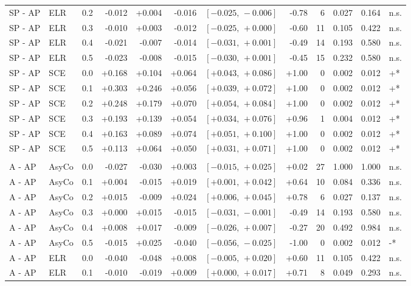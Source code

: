 \begin{landscape}
\begin{scriptsize}
\begin{longtable}{lllrrrrrrrrl}
SP - AP & ELR & 0.2 & -0.012 & +0.004 & -0.016 & $[-0.025,\,-0.006]$ & -0.78 & 6 & 0.027 & 0.164 & n.s. \\
SP - AP & ELR & 0.3 & -0.010 & +0.003 & -0.012 & $[-0.025,\,+0.000]$ & -0.60 & 11 & 0.105 & 0.422 & n.s. \\
SP - AP & ELR & 0.4 & -0.021 & -0.007 & -0.014 & $[-0.031,\,+0.001]$ & -0.49 & 14 & 0.193 & 0.580 & n.s. \\
SP - AP & ELR & 0.5 & -0.023 & -0.008 & -0.015 & $[-0.030,\,+0.001]$ & -0.45 & 15 & 0.232 & 0.580 & n.s. \\
SP - AP & SCE & 0.0 & +0.168 & +0.104 & +0.064 & $[+0.043,\,+0.086]$ & +1.00 & 0 & 0.002 & 0.012 & +* \\
SP - AP & SCE & 0.1 & +0.303 & +0.246 & +0.056 & $[+0.039,\,+0.072]$ & +1.00 & 0 & 0.002 & 0.012 & +* \\
SP - AP & SCE & 0.2 & +0.248 & +0.179 & +0.070 & $[+0.054,\,+0.084]$ & +1.00 & 0 & 0.002 & 0.012 & +* \\
SP - AP & SCE & 0.3 & +0.193 & +0.139 & +0.054 & $[+0.034,\,+0.076]$ & +0.96 & 1 & 0.004 & 0.012 & +* \\
SP - AP & SCE & 0.4 & +0.163 & +0.089 & +0.074 & $[+0.051,\,+0.100]$ & +1.00 & 0 & 0.002 & 0.012 & +* \\
SP - AP & SCE & 0.5 & +0.113 & +0.064 & +0.050 & $[+0.031,\,+0.071]$ & +1.00 & 0 & 0.002 & 0.012 & +* \\
\addlinespace
\multicolumn{12}{l}{\textit{Macro AUC}} \\
A - AP & AsyCo & 0.0 & -0.027 & -0.030 & +0.003 & $[-0.015,\,+0.025]$ & +0.02 & 27 & 1.000 & 1.000 & n.s. \\
A - AP & AsyCo & 0.1 & +0.004 & -0.015 & +0.019 & $[+0.001,\,+0.042]$ & +0.64 & 10 & 0.084 & 0.336 & n.s. \\
A - AP & AsyCo & 0.2 & +0.015 & -0.009 & +0.024 & $[+0.006,\,+0.045]$ & +0.78 & 6 & 0.027 & 0.137 & n.s. \\
A - AP & AsyCo & 0.3 & +0.000 & +0.015 & -0.015 & $[-0.031,\,-0.001]$ & -0.49 & 14 & 0.193 & 0.580 & n.s. \\
A - AP & AsyCo & 0.4 & +0.008 & +0.017 & -0.009 & $[-0.026,\,+0.007]$ & -0.27 & 20 & 0.492 & 0.984 & n.s. \\
A - AP & AsyCo & 0.5 & -0.015 & +0.025 & -0.040 & $[-0.056,\,-0.025]$ & -1.00 & 0 & 0.002 & 0.012 & -* \\
A - AP & ELR & 0.0 & -0.040 & -0.048 & +0.008 & $[-0.005,\,+0.020]$ & +0.60 & 11 & 0.105 & 0.422 & n.s. \\
A - AP & ELR & 0.1 & -0.010 & -0.019 & +0.009 & $[+0.000,\,+0.017]$ & +0.71 & 8 & 0.049 & 0.293 & n.s. \\

\end{longtable}
\end{scriptsize}
\end{landscape}
